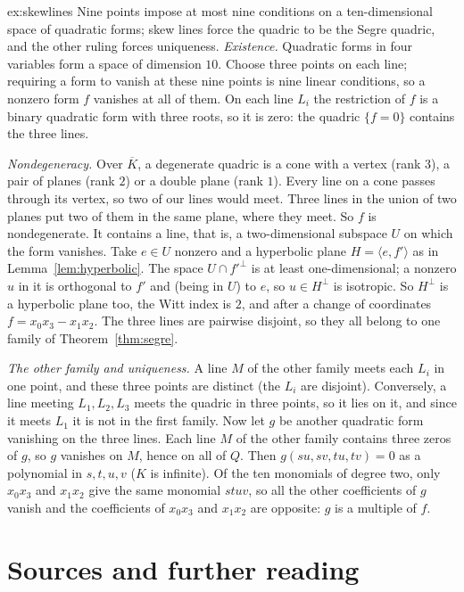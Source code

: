 \begin{solution}{ex:skewlines}
\idea Nine points impose at most nine conditions on a ten-dimensional space of quadratic forms; skew lines force the quadric to be the Segre quadric,
and the other ruling forces uniqueness.
\writeup \emph{Existence.} Quadratic forms in four variables form a space of dimension $10$. Choose three points on each line; requiring a form to vanish
at these nine points is nine linear conditions, so a nonzero form $f$ vanishes at all of them. On each line $L_i$ the restriction of $f$ is a binary
quadratic form with three roots, so it is zero: the quadric $\{f=0\}$ contains the three lines.

\emph{Nondegeneracy.} Over $\overline K$, a degenerate quadric is a cone with a vertex (rank $3$), a pair of planes (rank $2$) or a double plane (rank $1$).
Every line on a cone passes through its vertex, so two of our lines would meet. Three lines in the union of two planes put two of them in the same plane,
where they meet. So $f$ is nondegenerate. It contains a line, that is, a two-dimensional subspace $U$ on which the form vanishes. Take $e\in U$ nonzero and a
hyperbolic plane $H=\langle e,f'\rangle$ as in Lemma~\ref{lem:hyperbolic}. The space $U\cap f'^\perp$ is at least one-dimensional; a nonzero $u$ in it is
orthogonal to $f'$ and (being in $U$) to $e$, so $u\in H^\perp$ is isotropic. So $H^\perp$ is a hyperbolic plane too, the Witt index is $2$, and after a
change of coordinates $f=x_0x_3-x_1x_2$. The three lines are pairwise disjoint, so they all belong to one family of Theorem~\ref{thm:segre}.

\emph{The other family and uniqueness.} A line $M$ of the other family meets each $L_i$ in one point, and these three points are distinct (the $L_i$ are
disjoint). Conversely, a line meeting $L_1,L_2,L_3$ meets the quadric in three points, so it lies on it, and since it meets $L_1$ it is not in the first family.
Now let $g$ be another quadratic form vanishing on the three lines. Each line $M$ of the other family contains three zeros of $g$, so $g$ vanishes on $M$, hence
on all of $Q$. Then $g(su,sv,tu,tv)=0$ as a polynomial in $s,t,u,v$ ($K$ is infinite). Of the ten monomials of degree two, only $x_0x_3$ and $x_1x_2$ give the
same monomial $stuv$, so all the other coefficients of $g$ vanish and the coefficients of $x_0x_3$ and $x_1x_2$ are opposite: $g$ is a multiple of $f$.
\end{solution}

\section*{Sources and further reading}

